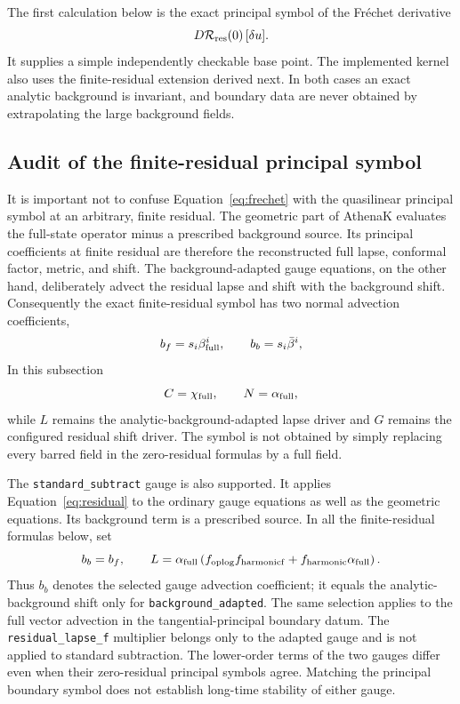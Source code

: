 \documentclass[11pt]{article}
\begin{document}
The first calculation below is the exact principal symbol of the Fr\'echet
derivative
\[
  D{\cal R}_{\rm res}(0)\,[\delta u].
  \label{eq:frechet}
\]
It supplies a simple independently checkable base point.  The implemented
kernel also uses the finite-residual extension derived next.  In both cases an
exact analytic background is invariant, and boundary data are never obtained
by extrapolating the large background fields.

\subsection{Audit of the finite-residual principal symbol}

It is important not to confuse Equation~\eqref{eq:frechet} with the
quasilinear principal symbol at an arbitrary, finite residual.  The geometric
part of AthenaK evaluates the full-state operator minus a prescribed
background source.  Its principal coefficients at finite residual are
therefore the reconstructed full lapse, conformal factor, metric, and shift.
The background-adapted gauge equations, on the other hand, deliberately
advect the residual lapse and shift with the background shift.  Consequently
the exact finite-residual symbol has two normal advection coefficients,
\[
  b_f=s_i\beta_{\rm full}^i,\qquad
  b_b=s_i\bar\beta^i,
\]
In this subsection
\[
 C=\chi_{\rm full},\qquad N=\alpha_{\rm full},
\]
while \(L\) remains the analytic-background-adapted lapse driver and \(G\)
remains the configured residual shift driver.  The symbol is not obtained by
simply replacing every barred field in the zero-residual formulas by a full
field.

The \texttt{standard\_subtract} gauge is also supported. It applies
Equation~\eqref{eq:residual} to the ordinary gauge equations as well as the
geometric equations. Its background term is a prescribed source. In all the
finite-residual formulas below, set
\[
 b_b=b_f,\qquad
 L=\alpha_{\rm full}\left(f_{\rm oplog}f_{\rm harmonicf}
                  +f_{\rm harmonic}\alpha_{\rm full}\right).
\]
Thus $b_b$ denotes the selected gauge advection coefficient; it equals the
analytic-background shift only for \texttt{background\_adapted}. The same
selection applies to the full vector advection in the tangential-principal
boundary datum. The \texttt{residual\_lapse\_f} multiplier belongs only to the
adapted gauge and is not applied to standard subtraction. The lower-order
terms of the two gauges differ even when their zero-residual principal
symbols agree. Matching the principal boundary symbol does not establish
long-time stability of either gauge.
\end{document}
